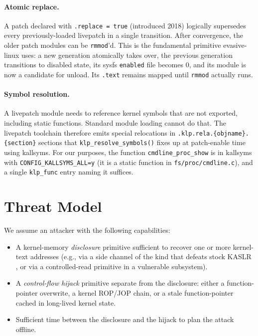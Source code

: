 \documentclass[10pt,letterpaper]{article}
\begin{document}
\paragraph{Atomic replace.} A patch declared with
\texttt{.replace = true} (introduced 2018) logically supersedes every
previously-loaded livepatch in a single transition. After convergence,
the older patch modules can be \texttt{rmmod}'d. This is the
fundamental primitive evasive-linux uses: a new generation atomically
takes over, the previous generation transitions to disabled state,
its sysfs \texttt{enabled} file becomes 0, and its module is now a
candidate for unload. Its \texttt{.text} remains mapped until
\texttt{rmmod} actually runs.

\paragraph{Symbol resolution.} A livepatch module needs to reference
kernel symbols that are not exported, including static functions.
Standard module loading cannot do that. The livepatch toolchain
therefore emits special relocations in
\texttt{.klp.rela.\{objname\}.\{section\}} sections that
\texttt{klp\_resolve\_symbols()} \cite{livepatch_docs} fixes up at
patch-enable time using kallsyms. For our purposes, the function
\texttt{cmdline\_proc\_show} is in kallsyms with
\texttt{CONFIG\_KALLSYMS\_ALL=y} (it is a static function in
\texttt{fs/proc/cmdline.c}), and a single \texttt{klp\_func} entry
naming it suffices.

\section{Threat Model}
\label{sec:threat}

We assume an attacker with the following capabilities:
\begin{itemize}[leftmargin=*]
\item A kernel-memory \emph{disclosure} primitive sufficient to
recover one or more kernel-text addresses (e.g., via a side channel
of the kind that defeats stock KASLR
\cite{hund_prefetch,gruss_prefetch,drk,entrybleed}, or via a
controlled-read primitive in a vulnerable subsystem).
\item A \emph{control-flow hijack} primitive separate from the
disclosure: either a function-pointer overwrite, a kernel ROP/JOP
chain, or a stale function-pointer cached in long-lived kernel state.
\item Sufficient time between the disclosure and the hijack to plan
the attack offline.
\end{itemize}
\end{document}
